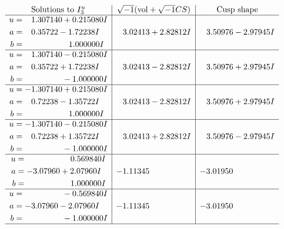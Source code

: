 \documentclass[1p]{elsarticle_modified}
\theoremstyle{definition}
\newcommand{\I}{\sqrt{-1}}
\begin{document}
$$\begin{array}{c|c|c}  
\text{Solutions to }I^u_{3}& \I (\text{vol} + \sqrt{-1}CS) & \text{Cusp shape}\\
 \hline 
\begin{aligned}
u &= \phantom{-}1.307140 + 0.215080 I \\
a &= \phantom{-}0.35722 - 1.72238 I \\
b &= \phantom{-0.000000 -}1.000000 I\end{aligned}
 & \phantom{-}3.02413 + 2.82812 I & \phantom{-}3.50976 - 2.97945 I \\ \hline\begin{aligned}
u &= \phantom{-}1.307140 - 0.215080 I \\
a &= \phantom{-}0.35722 + 1.72238 I \\
b &= \phantom{-0.000000 } -1.000000 I\end{aligned}
 & \phantom{-}3.02413 - 2.82812 I & \phantom{-}3.50976 + 2.97945 I \\ \hline\begin{aligned}
u &= -1.307140 + 0.215080 I \\
a &= \phantom{-}0.72238 - 1.35722 I \\
b &= \phantom{-0.000000 -}1.000000 I\end{aligned}
 & \phantom{-}3.02413 - 2.82812 I & \phantom{-}3.50976 + 2.97945 I \\ \hline\begin{aligned}
u &= -1.307140 - 0.215080 I \\
a &= \phantom{-}0.72238 + 1.35722 I \\
b &= \phantom{-0.000000 } -1.000000 I\end{aligned}
 & \phantom{-}3.02413 + 2.82812 I & \phantom{-}3.50976 - 2.97945 I \\ \hline\begin{aligned}
u &= \phantom{-0.000000 -}0.569840 I \\
a &= -3.07960 + 2.07960 I \\
b &= \phantom{-0.000000 -}1.000000 I\end{aligned}
 & -1.11345\phantom{ +0.000000I} & -3.01950\phantom{ +0.000000I} \\ \hline\begin{aligned}
u &= \phantom{-0.000000 } -0.569840 I \\
a &= -3.07960 - 2.07960 I \\
b &= \phantom{-0.000000 } -1.000000 I\end{aligned}
 & -1.11345\phantom{ +0.000000I} & -3.01950\phantom{ +0.000000I}\\
 \hline 
 \end{array}$$\newpage\newpage\renewcommand{\arraystretch}{1}
\end{document}

